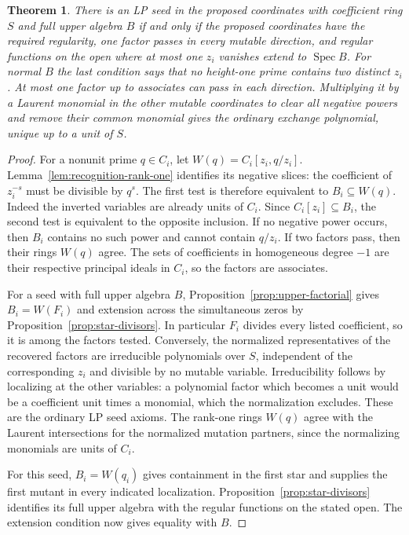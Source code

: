 \documentclass[11pt,reqno]{amsart}
\numberwithin{equation}{section}
\newtheorem{theorem}{Theorem}[section]
\theoremstyle{definition}
\theoremstyle{remark}
\DeclareMathOperator{\Spec}{Spec}
\begin{document}
\begin{theorem}\label{thm:recover-reverse-exchanges}
There is an LP seed in the proposed coordinates with coefficient ring
\(S\) and full upper algebra \(B\) if and only if the proposed
coordinates have the required regularity, one factor passes in every
mutable direction, and regular functions on the open where at most one
\(z_i\) vanishes extend to \(\Spec B\). For normal \(B\) the last
condition says that no height-one prime contains two distinct \(z_i\). At most one factor up to associates can pass
in each direction. Multiplying it by a Laurent monomial in the other
mutable coordinates to clear all negative powers and remove their
common monomial gives the ordinary exchange polynomial, unique up
to a unit of \(S\).
\end{theorem}
\begin{proof}
For a nonunit prime \(q\in C_i\), let \(W(q)=C_i[z_i,q/z_i]\).
Lemma~\ref{lem:recognition-rank-one} identifies its negative slices:
the coefficient of \(z_i^{-s}\) must be divisible by \(q^s\).
The first test is therefore equivalent to \(B_i\subseteq W(q)\).
Indeed the inverted variables are already units of \(C_i\). Since
\(C_i[z_i]\subseteq B_i\), the second test is equivalent to the
opposite inclusion. If no negative power occurs, then \(B_i\)
contains no such power and cannot contain \(q/z_i\).
If two factors pass, then their rings \(W(q)\) agree. The sets of
coefficients in homogeneous degree \(-1\) are their respective
principal ideals in \(C_i\), so the factors are associates.

For a seed with full upper algebra \(B\),
Proposition~\ref{prop:upper-factorial} gives \(B_i=W(F_i)\) and
extension across the simultaneous zeros by
Proposition~\ref{prop:star-divisors}. In particular \(F_i\) divides every
listed coefficient, so it is among the factors tested. Conversely,
the normalized representatives of the recovered factors are
irreducible polynomials over \(S\), independent of the corresponding
\(z_i\) and divisible by no mutable variable. Irreducibility follows
by localizing at the other variables: a polynomial factor which
becomes a unit would be a coefficient unit times a monomial, which
the normalization excludes. These are the ordinary LP seed axioms.
The rank-one rings \(W(q)\) agree with the Laurent intersections
for the normalized mutation partners, since the normalizing monomials
are units of \(C_i\).

For this seed, \(B_i=W(q_i)\) gives containment in the first star
and supplies the first mutant in every indicated localization.
Proposition~\ref{prop:star-divisors} identifies its full upper algebra
with the regular functions on the stated open. The extension
condition now gives equality with \(B\).
\end{proof}
\end{document}
